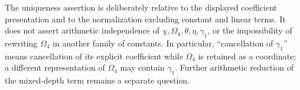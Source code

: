 The uniqueness assertion is deliberately relative to the displayed
coefficient presentation and to the normalization excluding constant
and linear terms. It does not assert arithmetic independence of
\(\chi,\Omega_4,\theta,\eta,\gamma_1\), or the impossibility of
rewriting \(\Omega_4\) in another family of constants. In particular,
``cancellation of \(\gamma_1\)'' means cancellation of its explicit
coefficient while \(\Omega_4\) is retained as a coordinate; a
different representation of \(\Omega_4\) may contain
\(\gamma_1\). Further arithmetic reduction of the mixed-depth term
remains a separate question.

